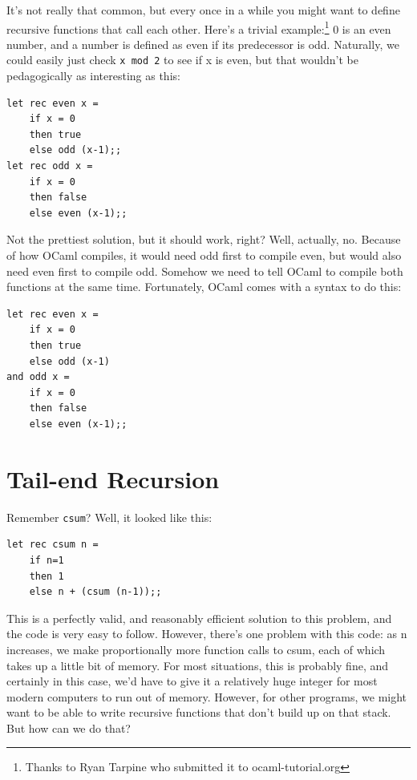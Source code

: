 \documentclass[10pt]{book}
\begin{document}
It's not really that common, but every once in a while you might want
to define recursive functions that call each other. Here's a trivial 
example:\footnote{Thanks to Ryan Tarpine who submitted it to 
ocaml-tutorial.org} 0 is an even number, and a number is defined as 
even if its predecessor is odd. Naturally, we could easily just check
{\tt x mod 2} to see if x is even, but that wouldn't be pedagogically
as interesting as this:

\beforeverb
\begin{verbatim}
let rec even x = 
	if x = 0
	then true
	else odd (x-1);;
let rec odd x = 
	if x = 0
	then false
	else even (x-1);;
\end{verbatim}
\afterverb

Not the prettiest solution, but it should work, right? Well, actually, no.
Because of how OCaml compiles, it would need odd first to compile even, but
would also need even first to compile odd. Somehow we need to tell OCaml to
compile both functions at the same time. Fortunately, OCaml comes with a 
syntax to do this:

\beforeverb
\begin{verbatim}
let rec even x = 
	if x = 0
	then true
	else odd (x-1)
and odd x = 
	if x = 0
	then false
	else even (x-1);;
\end{verbatim}
\afterverb

\section{Tail-end Recursion}


Remember {\tt csum}? Well, it looked like this:

\beforeverb
\begin{verbatim}
let rec csum n = 
	if n=1
	then 1
	else n + (csum (n-1));;
\end{verbatim}
\afterverb

This is a perfectly valid, and reasonably efficient solution to this
problem, and the code is very easy to follow. However, there's one 
problem with this code: as n increases, we make proportionally more 
function calls to csum, each of which takes up a little bit of memory.
For most situations, this is probably fine, and certainly in this case,
we'd have to give it a relatively huge integer for most modern computers 
to run out of memory. However, for other programs, we might want to be 
able to write recursive functions that don't build up on that stack. But 
how can we do that?
\end{document}
